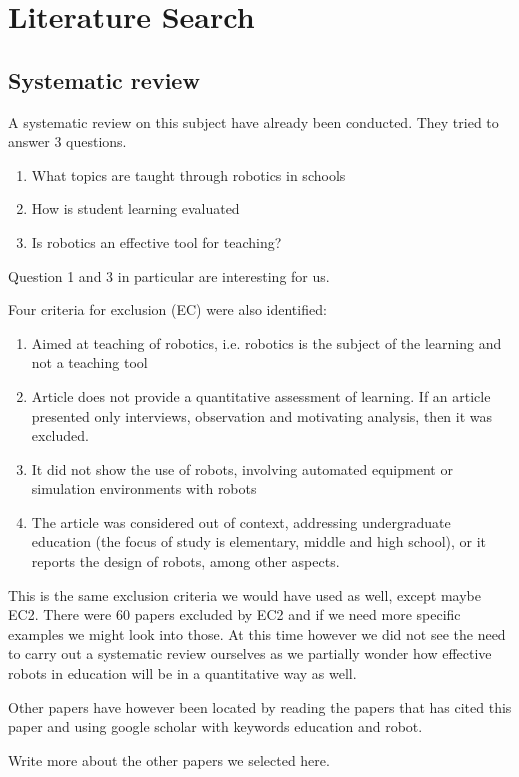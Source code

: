 \section*{Literature Search}
\subsection{Systematic review}

A systematic review on this subject have already been conducted\cite{Benitti2012978}. They tried to answer 3 questions. 

\begin{enumerate}
  \item What topics are taught through robotics in schools
  \item How is student learning evaluated
  \item Is robotics an effective tool for teaching?
\end{enumerate}

Question 1 and 3 in particular are interesting for us. 

Four criteria for exclusion (EC) were also identified:

\begin{enumerate}
  \item Aimed at teaching of robotics, i.e. robotics is the subject of the learning and not a teaching tool
  \item Article does not provide a quantitative assessment of learning. If an article presented only interviews, observation and motivating
analysis, then it was excluded.
  \item It did not show the use of robots, involving automated equipment or simulation environments with robots
	\item The article was considered out of context, addressing undergraduate education (the focus of study is elementary, middle and high
school), or it reports the design of robots, among other aspects.
\end{enumerate}

This is the same exclusion criteria we would have used as well, except maybe EC2. There were 60 papers excluded by EC2 and if we need more specific examples we might look into those. At this time however we did not see the need to carry out a systematic review ourselves as we partially wonder how effective robots in education will be in a quantitative way as well. 

Other papers have however been located by reading the papers that has cited this paper and using google scholar with keywords education and robot. 

Write more about the other papers we selected here.

